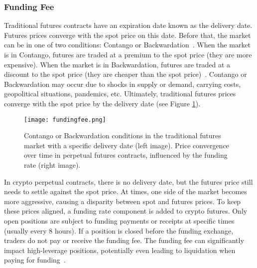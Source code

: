 \subsubsection{Funding Fee}\label{appx:funding}
Traditional futures contracts have an expiration date known as the delivery date. Futures prices converge with the spot price on this date. Before that, the market can be in one of two conditions: Contango or Backwardation~\cite{cme2020contango}. When the market is in Contango, futures are traded at a premium to the spot price (\ie they are more expensive). When the market is in Backwardation, futures are traded at a discount to the spot price (\ie they are cheaper than the spot price)~\cite{abd2019contango}. Contango or Backwardation may occur due to shocks in supply or demand, carrying costs, geopolitical situations, pandemics, etc. Ultimately, traditional futures prices converge with the spot price by the delivery date (see Figure \ref{fig:fundingfee}).

\begin{figure}[t]
	\centering
	\texttt{[image: fundingfee.png]}
	\caption[Price convergence in the Futures market vs. Perpetuals]{Contango or Backwardation conditions in the traditional futures market with a specific delivery date (left image). Price convergence over time in perpetual futures contracts, influenced by the funding rate (right image).}
	\label{fig:fundingfee}
\end{figure}

In crypto perpetual contracts, there is no delivery date, but the futures price still needs to settle against the spot price. At times, one side of the market becomes more aggressive, causing a disparity between spot and futures prices. To keep these prices aligned, a funding rate component is added to crypto futures. Only open positions are subject to funding payments or receipts at specific times (usually every 8 hours). If a position is closed before the funding exchange, traders do not pay or receive the funding fee. The funding fee can significantly impact high-leverage positions, potentially even leading to liquidation when paying for funding~\cite{Poloniex_FundingFee}.

